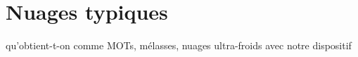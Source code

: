 \section{Nuages typiques}
	\noindent qu'obtient-t-on comme MOTs, mélasses, nuages ultra-froids avec notre dispositif
	
%		
%		
%		
%		
%
